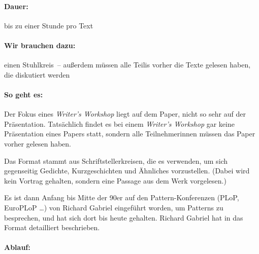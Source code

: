 \paragraph{Dauer:} bis zu einer Stunde pro Text
\paragraph{Wir brauchen dazu:} einen Stuhlkreis~-- außerdem müssen alle Teilis vorher die Texte gelesen haben, die diskutiert werden
\paragraph{So geht es:}
Der Fokus eines \emph{Writer's Workshop} liegt auf dem Paper, nicht so sehr
auf der Präsentation. Tatsächlich findet es bei einem \emph{Writer's Workshop}
gar keine Präsentation eines Papers statt, sondern alle Teilnehmerinnen müssen das Paper vorher gelesen haben.

Das Format stammt aus Schriftstellerkreisen, die es verwenden, um sich
gegenseitig Gedichte, Kurzgeschichten und Ähnliches vorzustellen. (Dabei wird
kein Vortrag gehalten, sondern eine Passage aus dem Werk vorgelesen.)

Es ist dann Anfang bis Mitte der 90er auf den Pattern-Konferenzen
(PLoP, EuroPLoP \ldots) von Richard Gabriel eingeführt worden, um
Patterns zu besprechen, und hat sich dort bis heute gehalten. Richard Gabriel hat in \cite{writers} das Format detailliert beschrieben.

\paragraph{Ablauf:}

